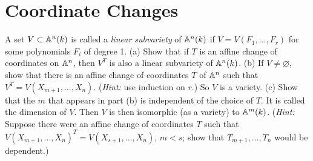 \section{Coordinate Changes}

\begin{exercise}
    A set $V \subset \mathbb{A}^n(k)$ is called a \textit{linear subvariety} of $\mathbb{A}^n(k)$ if $V = V(F_1, ..., F_r)$ for some polynomials $F_i$ of degree 1. (a) Show that if $T$ is an affine change of coordinates on $\mathbb{A}^n$, then $V^T$ is also a linear subvariety of $\mathbb{A}^n(k)$. (b) If $V \neq \varnothing$, show that there is an affine change of coordinates $T$ of $\mathbb{A}^n$ such that $V^T = V(X_{m+1}, ..., X_n)$. (\textit{Hint:} use induction on $r$.) So $V$ is a variety. (c) Show that the $m$ that appears in part (b) is independent of the choice of $T$. It is called the dimension of $V$. Then $V$ is then isomorphic (as a variety) to $\mathbb{A}^m(k)$. (\textit{Hint:} Suppose there were an affine change of coordinates $T$ such that $V(X_{m+1}, ..., X_n)^T = V(X_{s+1}, ..., X_n)$, $m < s$; show that $T_{m+1}, ..., T_n$ would be dependent.) \\
\end{exercise}

